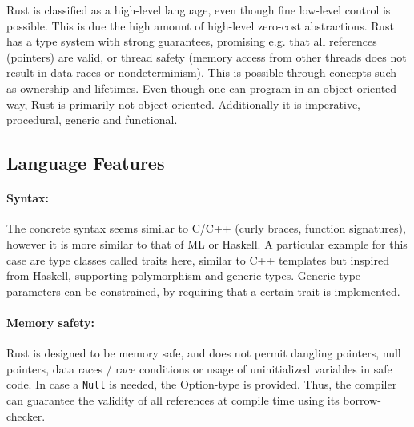 Rust is classified as a high-level language, even though fine low-level control
is possible. This is due the high amount of high-level zero-cost abstractions.
Rust has a type system with strong guarantees, promising e.g. that all
references (pointers) are valid, or thread safety (memory access from other
threads does not result in data races or nondeterminism). This is possible
through concepts such as ownership and lifetimes. Even though one can program
in an object oriented way, Rust is primarily not object-oriented. Additionally
it is imperative, procedural, generic and functional.


\subsection{Language Features}\label{sec:RustFeatures}


\paragraph{Syntax:}\label{sec:syntax}
The concrete syntax seems similar to C/C++ (curly braces, function signatures),
however it is more similar to that of ML or Haskell. A particular example for
this case are type classes called traits here, similar to C++ templates but
inspired from Haskell, supporting polymorphism and generic types. Generic
type parameters can be constrained, by requiring that a certain trait is
implemented.

\paragraph{Memory safety:}\label{sec:memsafe}
Rust is designed to be memory safe, and does not permit dangling pointers, null
pointers, data races / race conditions or usage of uninitialized variables in
safe code. In case a \verb|Null| is needed, the Option-type is provided. Thus,
the compiler can guarantee the validity of all references at compile time using
its borrow-checker.



